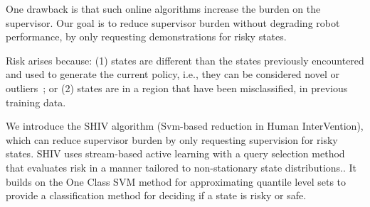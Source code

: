 \documentclass[10pt, conference]{ieeeconf}      %
\newcommand{\adnote}[1]{\ifthenelse{\boolean{include-notes}}%
 {\textcolor{green}{\textbf{AD: #1}}}{}}
\begin{document}
One drawback is that such online algorithms increase the burden on the supervisor. Our goal is to reduce supervisor burden without degrading robot performance, by only requesting demonstrations for risky states.

Risk arises because:  (1) states are different than the states previously encountered and used to generate the current policy, i.e., they can be considered novel or outliers~\cite{hodge2004survey}; or (2) states are in a region that have been misclassified, in previous training data.

We introduce the SHIV algorithm (Svm-based reduction in Human InterVention), which can reduce supervisor burden by only requesting supervision for risky states. SHIV uses stream-based active learning with a query selection method that evaluates risk in a manner tailored to non-stationary state distributions.. It builds on the One Class SVM method for approximating quantile level sets \cite{scholkopf2001estimating} to provide a classification method for deciding if a state is risky or safe.








\end{document}
